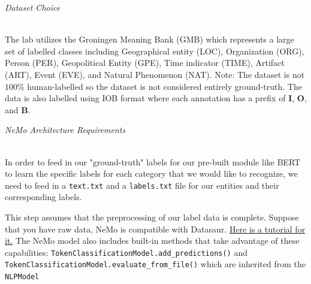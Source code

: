 \documentclass{article}
\begin{document}
\noindent\begin{Large}\textit{Dataset Choice}\end{Large}\vspace{10pt}\\
\indent The lab utilizes the Groningen Meaning Bank (GMB) which represents a large set of labelled classes including Geographical entity (LOC), Organization (ORG), Person (PER), Geopolitical Entity (GPE), Time indicator (TIME), Artifact (ART), Event (EVE), and Natural Phenomenon (NAT). Note: The dataset is not $100\%$ human-labelled so the dataset is not considered entirely ground-truth. The data is also labelled using IOB format where each annotation has a prefix of \textbf{I}, \textbf{O}, and \textbf{B}.\vspace{15pt}\\ 

\noindent\begin{Large}\textit{NeMo Architecture Requirements}\end{Large}\vspace{10pt}\\
In order to feed in our "ground-truth" labels for our pre-built module like BERT to learn the specific labels for each category that we would like to recognize, we need to feed in a \verb|text.txt| and a \verb|labels.txt| file for our entities and their corresponding labels. 

This step assumes that the preprocessing of our label data is complete. Suppose that you have raw data, NeMo is compatible with Datasaur. \href{https://www.youtube.com/watch?v=I9WVmnnSciE}{Here is a tutorial for it.} The NeMo model also includes built-in methods that take advantage of these capabilities: \verb|TokenClassificationModel.add_predictions()| and \verb|TokenClassificationModel.evaluate_from_file()| which are inherited from the \verb|NLPModel| \vspace{15pt}\\ 

\end{document}
